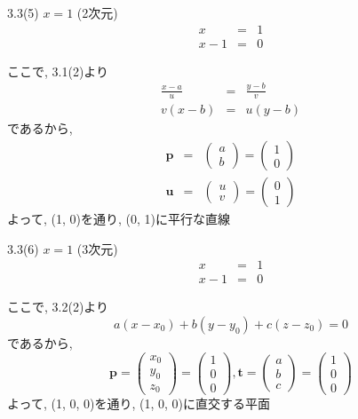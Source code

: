 \documentclass{beamer}
\begin{document}
\begin{frame}{3.3(5) $x = 1$ (2次元)}
  \begin{eqnarray*}
    x &=& 1\\
    x-1 &=& 0
  \end{eqnarray*}

  ここで, 3.1(2)より
  \begin{eqnarray*}
    \frac{x-a}{u} &=& \frac{y-b}{v} \\
    v(x-b) &=& u(y-b)
  \end{eqnarray*}
  であるから, 
  \begin{eqnarray*}
    \bm{p} &=& 
    \begin{pmatrix}
      a\\
      b
    \end{pmatrix} =
    \begin{pmatrix}
      1\\
      0
    \end{pmatrix} \\
    \bm{u} &=&
    \begin{pmatrix}
      u\\
      v
    \end{pmatrix} =
    \begin{pmatrix}
      0\\
      1
    \end{pmatrix}
  \end{eqnarray*}
  よって, (1, 0)を通り, (0, 1)に平行な直線
\end{frame}


\begin{frame}{3.3(6) $x = 1$ (3次元)}
  \begin{eqnarray*}
    x &=& 1\\
    x-1 &=& 0
  \end{eqnarray*}

  ここで, 3.2(2)より
  \begin{equation*}
    a(x-x_0) + b(y-y_0) + c(z-z_0) = 0
  \end{equation*}
  であるから, 
  \begin{equation*}
    \bm{p} = 
    \begin{pmatrix}
      x_0\\
      y_0\\
      z_0
    \end{pmatrix} =
    \begin{pmatrix}
      1\\
      0\\
      0
    \end{pmatrix} , 
    \bm{t} = 
    \begin{pmatrix}
      a\\
      b\\
      c
    \end{pmatrix} =
    \begin{pmatrix}
      1\\
      0\\
      0
    \end{pmatrix}
  \end{equation*}
  よって, (1, 0, 0)を通り, (1, 0, 0)に直交する平面
\end{frame}
\end{document}
